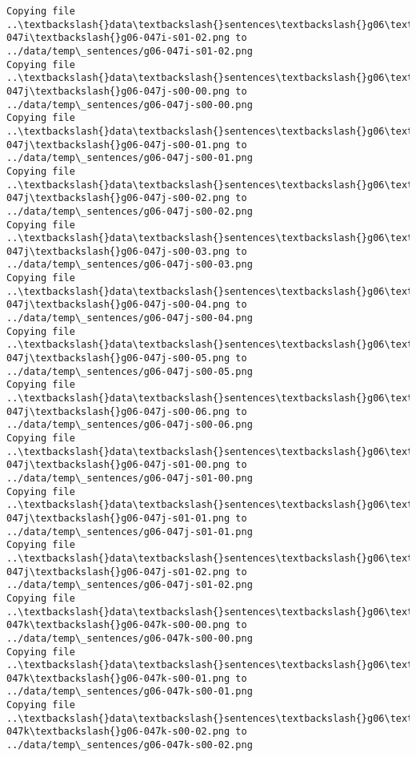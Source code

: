 \documentclass[11pt]{article}
\begin{document}
\begin{Verbatim}[commandchars=\\\{\}]
Copying file ..\textbackslash{}data\textbackslash{}sentences\textbackslash{}g06\textbackslash{}g06-047i\textbackslash{}g06-047i-s01-02.png to
../data/temp\_sentences/g06-047i-s01-02.png
Copying file ..\textbackslash{}data\textbackslash{}sentences\textbackslash{}g06\textbackslash{}g06-047j\textbackslash{}g06-047j-s00-00.png to
../data/temp\_sentences/g06-047j-s00-00.png
Copying file ..\textbackslash{}data\textbackslash{}sentences\textbackslash{}g06\textbackslash{}g06-047j\textbackslash{}g06-047j-s00-01.png to
../data/temp\_sentences/g06-047j-s00-01.png
Copying file ..\textbackslash{}data\textbackslash{}sentences\textbackslash{}g06\textbackslash{}g06-047j\textbackslash{}g06-047j-s00-02.png to
../data/temp\_sentences/g06-047j-s00-02.png
Copying file ..\textbackslash{}data\textbackslash{}sentences\textbackslash{}g06\textbackslash{}g06-047j\textbackslash{}g06-047j-s00-03.png to
../data/temp\_sentences/g06-047j-s00-03.png
Copying file ..\textbackslash{}data\textbackslash{}sentences\textbackslash{}g06\textbackslash{}g06-047j\textbackslash{}g06-047j-s00-04.png to
../data/temp\_sentences/g06-047j-s00-04.png
Copying file ..\textbackslash{}data\textbackslash{}sentences\textbackslash{}g06\textbackslash{}g06-047j\textbackslash{}g06-047j-s00-05.png to
../data/temp\_sentences/g06-047j-s00-05.png
Copying file ..\textbackslash{}data\textbackslash{}sentences\textbackslash{}g06\textbackslash{}g06-047j\textbackslash{}g06-047j-s00-06.png to
../data/temp\_sentences/g06-047j-s00-06.png
Copying file ..\textbackslash{}data\textbackslash{}sentences\textbackslash{}g06\textbackslash{}g06-047j\textbackslash{}g06-047j-s01-00.png to
../data/temp\_sentences/g06-047j-s01-00.png
Copying file ..\textbackslash{}data\textbackslash{}sentences\textbackslash{}g06\textbackslash{}g06-047j\textbackslash{}g06-047j-s01-01.png to
../data/temp\_sentences/g06-047j-s01-01.png
Copying file ..\textbackslash{}data\textbackslash{}sentences\textbackslash{}g06\textbackslash{}g06-047j\textbackslash{}g06-047j-s01-02.png to
../data/temp\_sentences/g06-047j-s01-02.png
Copying file ..\textbackslash{}data\textbackslash{}sentences\textbackslash{}g06\textbackslash{}g06-047k\textbackslash{}g06-047k-s00-00.png to
../data/temp\_sentences/g06-047k-s00-00.png
Copying file ..\textbackslash{}data\textbackslash{}sentences\textbackslash{}g06\textbackslash{}g06-047k\textbackslash{}g06-047k-s00-01.png to
../data/temp\_sentences/g06-047k-s00-01.png
Copying file ..\textbackslash{}data\textbackslash{}sentences\textbackslash{}g06\textbackslash{}g06-047k\textbackslash{}g06-047k-s00-02.png to
../data/temp\_sentences/g06-047k-s00-02.png

\end{Verbatim}
\end{document}
